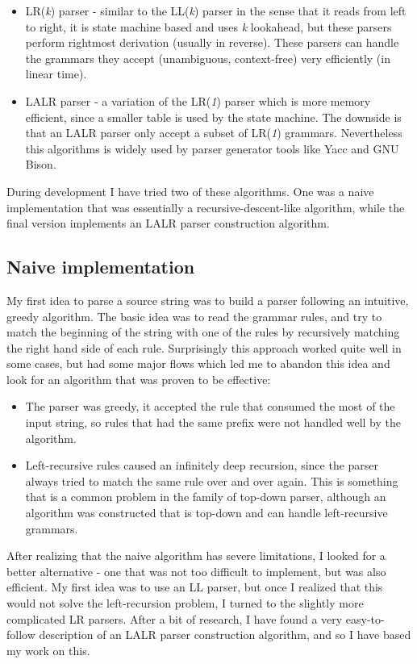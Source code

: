\begin{itemize}
\begin{itemize}
\item LR(\textit{k}) parser - similar to the LL(\textit{k}) parser in the sense that it reads from left to right, it is state machine based and uses \textit{k} lookahead, but these parsers perform rightmost derivation (usually in reverse). These parsers can handle the grammars they accept (unambiguous, context-free) very efficiently (in linear time). 
\item LALR parser - a variation of the LR(\textit{1}) parser which is more memory efficient, since a smaller table is used by the state machine. The downside is that an LALR parser only accept a subset of LR(\textit{1}) grammars. Nevertheless this algorithms is widely used by parser generator tools like Yacc and GNU Bison.  
\end{itemize}
\end{itemize}
During development I have tried two of these algorithms. One was a naive implementation that was essentially a recursive-descent-like algorithm, while the final version implements an LALR parser construction algorithm. 
\subsection{Naive implementation}
My first idea to parse a source string was to build a parser following an intuitive, greedy algorithm. The basic idea was to read the grammar rules, and try to match the beginning of the string with one of the rules by recursively matching the right hand side of each rule. Surprisingly this approach worked quite well in some cases, but had some major flows which led me to abandon this idea and look for an algorithm that was proven to be effective:
\begin{itemize}
\item The parser was greedy, it accepted the rule that consumed the most of the input string, so rules that had the same prefix were not handled well by the algorithm.
\item Left-recursive rules caused an infinitely deep recursion, since the parser always tried to match the same rule over and over again. This is something that is a common problem in the family of top-down parser, although an algorithm was constructed \cite{frost2007modular} that is top-down and can handle left-recursive grammars.
\end{itemize}
After realizing that the naive algorithm has severe limitations, I looked for a better alternative - one that was not too difficult to implement, but was also efficient. My first idea was to use an LL parser, but once I realized that this would not solve the left-recursion problem, I turned to the slightly more complicated LR parsers. After a bit of research, I have found a very easy-to-follow description of an LALR parser construction algorithm, and so I have based my work on this.
